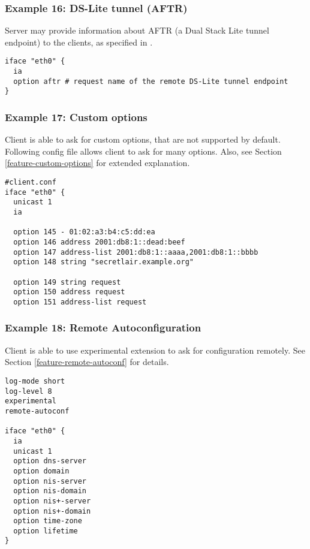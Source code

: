 \subsubsection{Example 16: DS-Lite tunnel (AFTR)}
\label{example-server-ds-lite}
Server may provide information about AFTR (a Dual Stack Lite tunnel
endpoint) to the clients, as specified in \cite{rfc6334}.

\begin{lstlisting}
iface "eth0" {
  ia
  option aftr # request name of the remote DS-Lite tunnel endpoint
}
\end{lstlisting}

\subsubsection{Example 17: Custom options}
Client is able to ask for custom options, that are not supported by
default. Following config file allows client to ask for many
options. Also, see Section \ref{feature-custom-options} for
extended explanation.

\begin{lstlisting}
#client.conf
iface "eth0" {
  unicast 1
  ia

  option 145 - 01:02:a3:b4:c5:dd:ea
  option 146 address 2001:db8:1::dead:beef
  option 147 address-list 2001:db8:1::aaaa,2001:db8:1::bbbb
  option 148 string "secretlair.example.org"

  option 149 string request
  option 150 address request
  option 151 address-list request
\end{lstlisting}

\subsubsection{Example 18: Remote Autoconfiguration}
Client is able to use experimental extension to ask for configuration
remotely. See Section \ref{feature-remote-autoconf} for details.

\begin{lstlisting}
log-mode short
log-level 8
experimental
remote-autoconf

iface "eth0" {
  ia
  unicast 1
  option dns-server
  option domain
  option nis-server
  option nis-domain
  option nis+-server
  option nis+-domain
  option time-zone
  option lifetime
}
\end{lstlisting}
